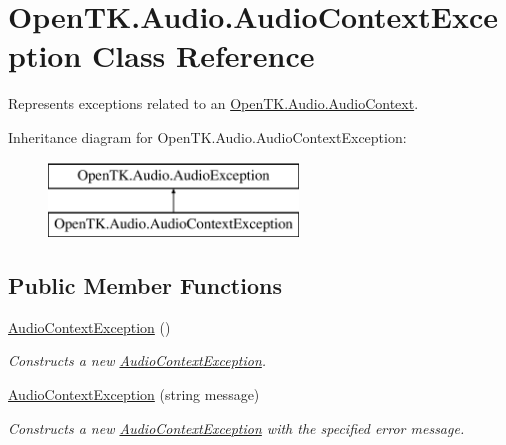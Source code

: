 \hypertarget{class_open_t_k_1_1_audio_1_1_audio_context_exception}{\section{Open\-T\-K.\-Audio.\-Audio\-Context\-Exception Class Reference}
\label{class_open_t_k_1_1_audio_1_1_audio_context_exception}
}


Represents exceptions related to an \hyperlink{class_open_t_k_1_1_audio_1_1_audio_context}{Open\-T\-K.\-Audio.\-Audio\-Context}. 


Inheritance diagram for Open\-T\-K.\-Audio.\-Audio\-Context\-Exception\-:\begin{figure}[H]
\begin{center}
\leavevmode
\includegraphics[height=2.000000cm]{class_open_t_k_1_1_audio_1_1_audio_context_exception}
\end{center}
\end{figure}
\subsection*{Public Member Functions}
\begin{DoxyCompactItemize}
\item 
\hyperlink{class_open_t_k_1_1_audio_1_1_audio_context_exception_a2d627aeabe43c853216f60d6c34fab22}{Audio\-Context\-Exception} ()
\begin{DoxyCompactList}\small\item\em Constructs a new \hyperlink{class_open_t_k_1_1_audio_1_1_audio_context_exception}{Audio\-Context\-Exception}.\end{DoxyCompactList}\item 
\hyperlink{class_open_t_k_1_1_audio_1_1_audio_context_exception_ac11738a462838289368ffecb977b978a}{Audio\-Context\-Exception} (string message)
\begin{DoxyCompactList}\small\item\em Constructs a new \hyperlink{class_open_t_k_1_1_audio_1_1_audio_context_exception}{Audio\-Context\-Exception} with the specified error message.\end{DoxyCompactList}\end{DoxyCompactItemize}


